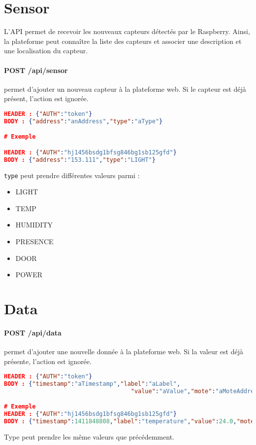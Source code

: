 \section{Sensor}

L'API permet de recevoir les nouveaux capteurs détectés par le Raspberry. Ainsi, la plateforme peut connaître la liste des capteurs et associer une description et une localisation du capteur.

\paragraph{POST /api/sensor} permet d'ajouter un nouveau capteur à la plateforme web. Si le capteur est déjà présent, l'action est ignorée.
\begin{lstlisting}[language=json,emph={token, anAddress, aType},emphstyle={\bfseries\itshape},basicstyle={\ttfamily},caption=POST /api/sensor]
HEADER : {"AUTH":"token"}
BODY : {"address":"anAddress","type":"aType"}

# Exemple

HEADER : {"AUTH":"hj1456bsdg1bfsg846bg1sb125gfd"}
BODY : {"address":"153.111","type":"LIGHT"}
\end{lstlisting}

\texttt{type} peut prendre différentes valeurs parmi :
\begin{itemize}
\item LIGHT
\item TEMP
\item HUMIDITY
\item PRESENCE
\item DOOR
\item POWER
\end{itemize}


\section{Data}

\paragraph{POST /api/data} permet d'ajouter une nouvelle donnée à la plateforme web. Si la valeur est déjà présente, l'action est ignorée.
\begin{lstlisting}[language=json,emph={token, aTimestamp, aLabel,aValue,aMoteAddress,aType},emphstyle={\bfseries\itshape},basicstyle={\ttfamily},caption=POST /api/data]
HEADER : {"AUTH":"token"}
BODY : {"timestamp":"aTimestamp","label":"aLabel",
									"value":"aValue","mote":"aMoteAddress.aType"}

# Exemple
HEADER : {"AUTH":"hj1456bsdg1bfsg846bg1sb125gfd"}
BODY : {"timestamp":1411848808,"label":"temperature","value":24.0,"mote":"219.98.TEMP"}
\end{lstlisting}

Type peut prendre les même valeurs que précédemment.